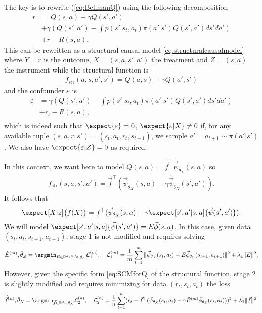 The key is to rewrite (\ref{eq:BellmanQ}) using the following decomposition
\begin{align}
    r&=Q(s,a)-\gamma Q(s',a')\nonumber\\
    &+\gamma\left(Q(s',a') - \int p(s'|s_t,a_t)\pi(a'|s')Q(s',a')ds'da'\right)\nonumber\\
    &+r-R(s,a).\label{eq:Keydecomposition}
\end{align}
This can be rewritten as a structural causal model \eqref{eq:structuralcausalmodel} where $Y=r$ is the outcome, $X=(s,a,s',a')$ the treatment and $Z=(s,a)$ the instrument while the structural function is 
\begin{align*}
      f_\mathrm{str}(a,s,a',s')=Q(a,s)-\gamma Q(a',s') 
\end{align*}
and the confounder $\varepsilon$ is
\begin{align}\label{eq:Noise}
    \varepsilon&=\gamma\left(Q(s',a') - \int p(s'|s_t,a_t)\pi(a'|s')Q(s',a')ds'da'\right)\nonumber\\
    &+r_t-R(s,a),\nonumber\\
\end{align}
which is indeed such that $\expect{\varepsilon}= 0$, $\expect{\varepsilon | X}\neq 0$ if, for any available tuple $(s,a,r,s')=(s_t,a_t,r_t,s_{t+1})$, we sample $a'=a_{t+1}\sim \pi(a'|s')$. We also have $\expect{\varepsilon | Z}=0$ as required.

In this context, we want here to model $Q(s,a)=\vec{f}^\top \vec{\psi}_{\theta_X}(s,a)$ so 
\begin{align}\label{eq:SCMforQ}
    f_\mathrm{str}(s,a,s',a') = \vec{f}^\top (\vec{\psi}_{\theta_X}(s,a) - \gamma \vec{\psi}_{\theta_X}(s',a')).
\end{align}
It follows that 
\begin{align*}
\expect[X|z]{f(X)} = \vec{f}^\top(\vec{\psi}_{\theta_X}(s,a)- \gamma \expect[s',a'|s,a]{\vec{\psi}(s',a')}).
\end{align*}
We will model $\expect[s',a'|s,a]{\vec{\psi}(s',a')}=E \vec{\phi}(s,a)$.
In this case, given data $(s_t,a_t,s_{t+1},a_{t+1})$, stage 1 is not modified and requires solving 
\begin{align}
    \hat{E}^{(m)}, \hat{\theta}_Z = \argmin_{E \in \mathbb{R}^{d_1 \times d_2}, \theta_Z} \mathcal{L}_1^{(m)}, \quad \mathcal{L}_1^{(m)} = \frac1m \sum_{t=1}^m \|\vec{\psi}_{\theta_X}(s_t,a_t) - E\vec{\phi}_{\theta_Z}(s_{t+1},a_{t+1})\|^2 + \lambda_1 \|E\|^2. \label{eq:stage1-empirical-loss_Q}
\end{align}
However, given the specific form \eqref{eq:SCMforQ} of the structural function, stage 2 is slightly modified and requires minimizing for data $(r_t,s_t,a_t)$ the loss
\begin{align}
    \hat{\vec{f}}^{(n)}, \hat{\theta}_X = \argmin_{\vec{f} \in \mathbb{R}^{d_1}, \theta_X}\mathcal{L}^{(n)}_2, \quad \mathcal{L}^{(n)}_2 = \frac1n \sum_{t=1}^n (r_t - \vec{f}^\top (\vec{\psi}_{\theta_X}(s_t,a_t)-\gamma\hat{E}^{(m)} \vec{\phi}_{\theta_Z}(s_t,a_t)))^2 + \lambda_2 \|\vec{f}\|^2. \label{eq:stage2-empirical-loss_Q}
\end{align}